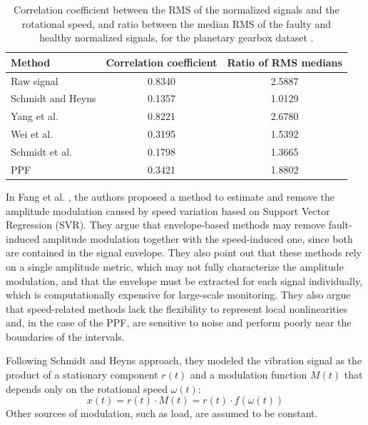 \begin{table}[H]
    \centering
    \begin{tabular}{lcc}
        \hline
        Method & Correlation coefficient & Ratio of RMS medians \\
        \hline
        Raw signal & 0.8340 & 2.5887 \\
        Schmidt and Heyns & 0.1357 & 1.0129 \\
        Yang et al. & 0.8221 & 2.6780 \\
        Wei et al.  & 0.3195 & 1.5392 \\
        Schmidt et al. & 0.1798 & 1.3665 \\
        PPF & 0.3421 & 1.8802 \\
        \hline
    \end{tabular}
    \caption{Correlation coefficient between the RMS of the normalized signals and the rotational speed, and ratio between the median RMS of the faulty and healthy normalized signals, for the planetary gearbox dataset \cite{RAO2024111751}.}
    \label{tab:Rao-Results}
\end{table}

In Fang et al. \cite{FANG2025}, the authors proposed a method to estimate and remove the amplitude modulation caused by speed variation based on Support Vector Regression (SVR). They argue that envelope-based methods may remove fault-induced amplitude modulation together with the speed-induced one, since both are contained in the signal envelope. They also point out that these methods rely on a single amplitude metric, which may not fully characterize the amplitude modulation, and that the envelope must be extracted for each signal individually, which is computationally expensive for large-scale monitoring. They also argue that speed-related methods lack the flexibility to represent local nonlinearities and, in the case of the PPF, are sensitive to noise and perform poorly near the boundaries of the intervals.

Following Schmidt and Heyns \cite{SCHMIDT2020106964} approach, they modeled the vibration signal as the product of a stationary component $r(t)$ and a modulation function $M(t)$ that depends only on the rotational speed $\omega(t)$:
\begin{equation}
    x(t) = r(t) \cdot M(t) = r(t) \cdot f(\omega(t))
\end{equation}
Other sources of modulation, such as load, are assumed to be constant.

